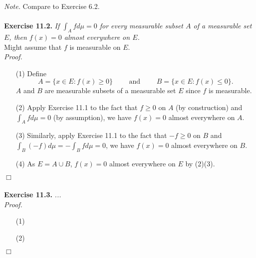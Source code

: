 \documentclass{article}
\begin{document}
\emph{Note.}
Compare to Exercise 6.2. \\\\






\textbf{Exercise 11.2.}
\emph{If $\int_A f d\mu = 0$ for every measurable subset $A$ of a measurable set $E$,
then $f(x) = 0$ almost everywhere on $E$.} \\

Might assume that $f$ is measurable on $E$. \\

\emph{Proof.}
\begin{enumerate}
\item[(1)]
  Define
  \[
    A = \{ x \in E : f(x) \geq 0 \}
    \qquad \text{ and } \qquad
    B = \{ x \in E : f(x) \leq 0 \}.
  \]
  $A$ and $B$ are measurable subsets of a measurable set $E$ since $f$ is measurable.

\item[(2)]
  Apply Exercise 11.1 to the fact that $f \geq 0$ on $A$ (by construction)
  and $\int_A f d\mu = 0$ (by assumption),
  we have $f(x) = 0$ almost everywhere on $A$.

\item[(3)]
  Similarly,
  apply Exercise 11.1 to the fact that $-f \geq 0$ on $B$
  and $\int_B (-f) d\mu = -\int_B f d\mu = 0$,
  we have $f(x) = 0$ almost everywhere on $B$.

\item[(4)]
  As $E = A \cup B$, $f(x) = 0$ almost everywhere on $E$ by (2)(3).
\end{enumerate}
$\Box$ \\\\






\textbf{Exercise 11.3.}
\emph{...} \\

\emph{Proof.}
\begin{enumerate}
\item[(1)]
\item[(2)]

\end{enumerate}
$\Box$ \\\\
\end{document}
